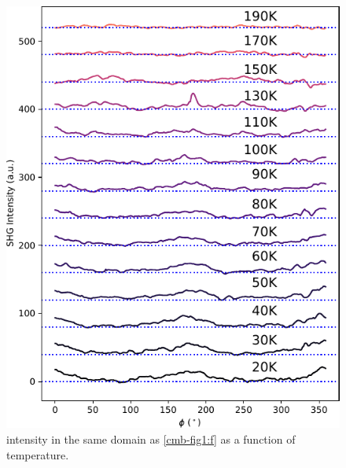 \begin{figure}
\centering
\includegraphics[width=\textwidth]{./gfx/ch6/ctempdep.pdf}
\caption[ intensity in the same domain as \cref{cmb-fig1:f} as a function of temperature]{\label{cmb-ctempdep}
 intensity in the same domain as \cref{cmb-fig1:f} as a function of temperature.
}
\end{figure}
